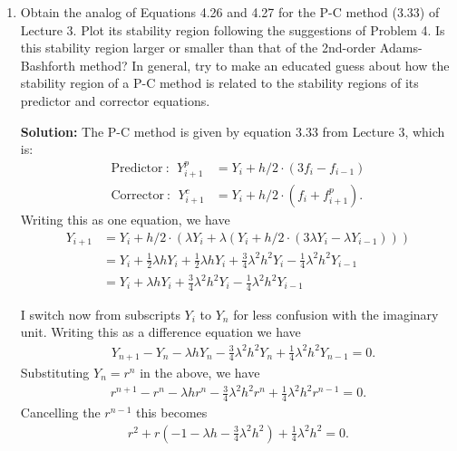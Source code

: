 \documentclass[11pt]{article}
\def\f{\frac }
\begin{document}
\begin{enumerate}

\item Obtain the analog of Equations 4.26 and 4.27 for the P-C method (3.33) of Lecture 3.
Plot its stability region following the suggestions of Problem 4.
Is this stability region larger or smaller than that of the 2nd-order Adams-Bashforth method?
In general, try to make an educated guess about how the stability region of a P-C method is related to the stability regions of its predictor and corrector equations.

\textbf{Solution:} The P-C method is given by equation 3.33 from Lecture 3, which is:
\begin{align} \text{Predictor}~:~~ Y_{i+1} ^p & = Y_i + h/2 \cdot ( 3f_i - f_{i-1} ) \\
\text{Corrector}~:~~ Y_{i+1} ^c & = Y_i + h/2 \cdot ( f_i + f^p_{i+1} ) .\end{align}
Writing this as one equation, we have
\begin{align} Y_{i+1} &= Y_i + h/2 \cdot \left( \lambda Y_i + \lambda \left ( Y_i + h/2 \cdot (3 \lambda Y_i - \lambda Y_{i-1}) \right ) \right ) \\
 &= Y_i + \f{1}{2} \lambda h Y_i + \frac{1}{2} \lambda h Y_i + \frac{3}{4} \lambda ^2 h^2 Y_i - \frac{1}{4} \lambda ^2 h^2 Y_{i-1} \\
 &= Y_i + \lambda h Y_i + \frac{3}{4} \lambda ^2 h^2 Y_i - \frac{1}{4} \lambda ^2 h^2 Y_{i-1} \end{align}

I switch now from subscripts $Y_i$ to $Y_n$ for less confusion with the imaginary unit.
Writing this as a difference equation we have
\begin{align} & Y_{n+1} - Y_n - \lambda h Y_n - \frac{3}{4} \lambda ^2 h^2 Y_n + \frac{1}{4} \lambda ^2 h^2 Y_{n-1}  = 0.\end{align}
Substituting $Y_n = r^n$ in the above, we have
\begin{align} r^{n+1} - r^n - \lambda h r^n - \frac{3}{4} \lambda ^2 h^2 r^n + \frac{1}{4} \lambda ^2 h^2 r^{n-1}   = 0.\end{align}
Cancelling the $r^{n-1}$ this becomes
\begin{align} r^2 + r \left ( -1 - \lambda h - \frac{3}{4} \lambda ^2 h^2 \right ) + \frac{1}{4} \lambda ^2 h^2 = 0.\end{align}


\end{enumerate}
\end{document}
